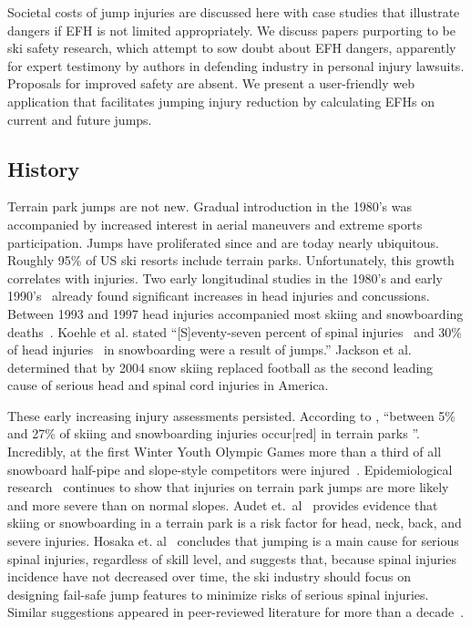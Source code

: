 \documentclass[smallextended]{svjour3}       %
\begin{document}
Societal costs of jump injuries are discussed here with case studies that
illustrate dangers if EFH is not limited appropriately. We discuss papers
purporting to be ski safety research, which attempt to sow doubt about EFH
dangers, apparently for expert testimony by authors in defending industry in
personal injury lawsuits. Proposals for improved safety are absent. We  present
a user-friendly web application that facilitates jumping injury reduction by
calculating EFHs on current and future jumps.

\subsection{History}
\label{sec:hist}
%
Terrain park jumps are not new. Gradual introduction in the 1980's was
accompanied by increased interest in aerial maneuvers and extreme sports
participation.  Jumps have proliferated since and are today nearly ubiquitous.
Roughly 95\% of US ski resorts include terrain parks. Unfortunately, this
growth correlates with injuries. Two early longitudinal studies in the 1980's
and early 1990's~\cite{Deibert1998,Furrer1995} already found significant
increases in head injuries and concussions. Between 1993 and 1997 head injuries
accompanied most skiing and snowboarding deaths~\cite{CPSC1999}. Koehle et al.
\cite{Koehle2002} stated ``[S]eventy-seven percent of spinal
injuries~\cite{Tarazi1999} and 30\% of head injuries~\cite{Fukuda2001} in
snowboarding were a result of jumps.'' Jackson et al.~\cite{Jackson2004}
determined that by 2004 snow skiing replaced football as the second leading
cause of serious head and spinal cord injuries in America.

These early increasing injury assessments persisted. According to
\cite{Russell2014}, ``between 5\% and 27\% of skiing and snowboarding injuries
occur[red] in terrain parks
\cite{Bridges2003,Goulet2007,Moffat2009,Greve2009,Brooks2010,Ruedl2013}''.
Incredibly, at the first Winter Youth Olympic Games more than a third of all
snowboard half-pipe and slope-style competitors were injured~\cite{Ruedl2012}.
Epidemiological research~\cite{Carus2016,Audet2020,Hosaka2020} continues to
show that injuries on terrain park jumps are more likely and more severe than
on normal slopes. Audet et.~al~\cite{Audet2020} provides evidence that skiing
or snowboarding in a terrain park is a risk factor for head, neck, back, and
severe injuries. Hosaka et. al~\cite{Hosaka2020} concludes that jumping is a
main cause for serious spinal injuries, regardless of skill level, and suggests
that, because spinal injuries incidence  have not decreased over time,  the ski
industry should focus on designing fail-safe jump features to minimize risks of
serious spinal injuries. Similar suggestions appeared in peer-reviewed literature
for more than a
decade~\cite{Hubbard2009,Swedberg2012,McNeil2012,McNeil2012a,Hubbard2015,Levy2015,Petrone2017,Moore2018}.
\end{document}
